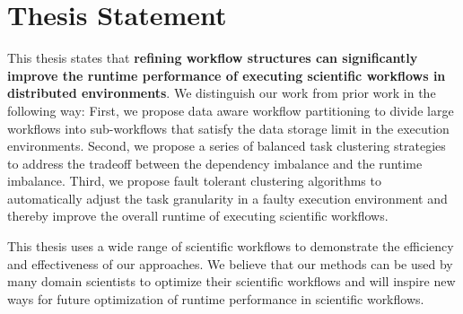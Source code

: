 

\section{Thesis Statement}
This thesis states that \textbf{refining workflow structures can significantly improve the runtime performance of executing scientific workflows in distributed environments}. We distinguish our work from prior work in the following way: First, we propose data aware workflow partitioning to divide large workflows into sub-workflows that satisfy the data storage limit in the execution environments. Second, we propose a series of balanced task clustering strategies to address the tradeoff between the dependency imbalance and the runtime imbalance. Third, we propose fault tolerant clustering algorithms to automatically adjust the task granularity in a faulty execution environment and thereby improve the overall runtime of executing scientific workflows. 

This thesis uses a wide range of scientific workflows to demonstrate the efficiency and effectiveness of our approaches. 
We believe that our methods can be used by many domain scientists to optimize their scientific workflows and will inspire new ways for future optimization of runtime performance in scientific workflows. 



